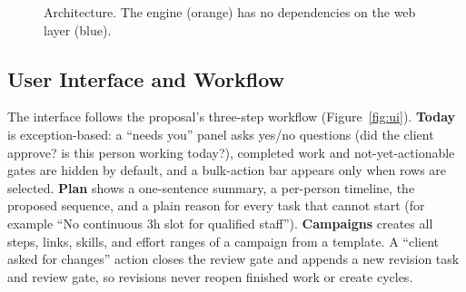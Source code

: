 \documentclass[sigconf,nonacm]{acmart}
\begin{document}
\begin{figure}[t]
\centering
{}
\caption{Architecture. The engine (orange) has no dependencies on the web layer (blue).}
\label{fig:arch}
\end{figure}

\subsection{User Interface and Workflow}
The interface follows the proposal's three-step workflow (Figure~\ref{fig:ui}).
\textbf{Today} is exception-based: a ``needs you'' panel asks yes/no questions (did the
client approve? is this person working today?), completed work and not-yet-actionable gates
are hidden by default, and a bulk-action bar appears only when rows are selected.
\textbf{Plan} shows a one-sentence summary, a per-person timeline, the proposed sequence,
and a plain reason for every task that cannot start (for example ``No continuous 3h slot
for qualified staff''). \textbf{Campaigns} creates all steps, links, skills, and effort
ranges of a campaign from a template. A ``client asked for changes'' action closes the
review gate and appends a new revision task and review gate, so revisions never reopen
finished work or create cycles.
\end{document}
